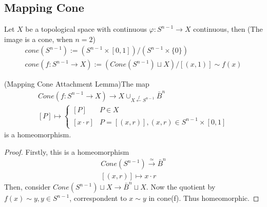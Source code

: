 \documentclass[Total.tex]{subfiles}
\begin{document}
	\subsection{Mapping Cone}
	\begin{Def}
		Let $X$ be a topological space with continuous $\varphi:S^{n-1}\rightarrow X$ continuous, then (The image is a cone, when $n=2$)
		\begin{gather*}
			cone(S^{n-1}):=(S^{n-1}\times [0,1])/(S^{n-1}\times \{0\})\\
			cone(f:S^{n-1}\rightarrow X):=(Cone(S^{n-1})\sqcup X)/[(x,1)]\sim f(x)
		\end{gather*}
	\end{Def}
	\begin{lemma}
		(Mapping Cone Attachment Lemma)The map
		\begin{gather*}
			Cone(f:S^{n-1}\rightarrow X)\rightarrow X\cup_{X\stackrel{f}{\leftarrow} S^{n-1}} \bar{B}^n\\
			[P]\mapsto  \begin{cases}
				[P]&P\in X\\
				[x\cdot r]&P=[(x,r)],(x,r)\in S^{n-1}\times [0,1]
			\end{cases}
		\end{gather*} 
		is a homeomorphism.
	\end{lemma}
	\begin{proof}
		Firstly, this is a homeomorphism
		\begin{gather*}
			Cone(S^{n-1})\stackrel{\simeq}{\rightarrow} \bar{B}^n\\
			[(x,r)]\mapsto x\cdot r
		\end{gather*}
		Then, consider $Cone(S^{n-1})\sqcup X\rightarrow \bar{B}^n\sqcup X$. Now the quotient by $f(x)\sim y,y\in S^{n-1}$, correspondent to $x\sim y$ in cone(f). Thus homeomorphic.
	\end{proof}
\end{document}

